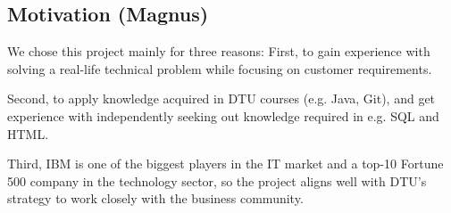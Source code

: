 \subsection{Motivation (Magnus)}
We chose this project mainly for three reasons: First, to gain experience with solving a real-life technical problem while focusing on customer requirements.

Second, to apply knowledge acquired in DTU courses (e.g. Java, Git), and get experience with independently seeking out knowledge required in e.g. SQL and HTML. 

Third, IBM is one of the biggest players in the IT market\cite{wikipedia_it_companies} and a top-10 Fortune 500 company in the technology sector\cite{fortune500}, so the project aligns well with DTU's strategy to work closely with the business community\cite{dtu_strategy}.